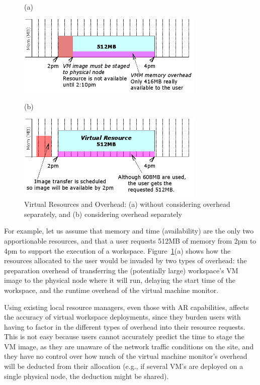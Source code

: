 \documentclass[singlespace]{ccw_chithesis}
\begin{document}
\begin{figure}
  \begin{center}
(a)

    \includegraphics[width=0.8\textwidth]{figures/virtualresources_a.png}

\vspace{3em}
(b)

    \includegraphics[width=0.8\textwidth]{figures/virtualresources_b.png}



    \caption{Virtual Resources and Overhead: (a) without considering overhead separately, and (b) considering overhead separately}
	\label{fig:virtualresources}
  \end{center}
\end{figure}

For example, let us assume that memory and time (availability) are the only two apportionable resources, and that a user requests 512MB of memory from 2pm to 4pm to support the execution of a workspace. Figure~\ref{fig:virtualresources}(a) shows how the resources allocated to the user would be invaded by two types of overhead: the preparation overhead of transferring the (potentially large) workspace's VM image to the physical node where it will run, delaying the start time of the workspace, and the runtime overhead of the virtual machine monitor. 

Using existing local resource managers, even those with AR capabilities, affects the accuracy of virtual workspace deployments, since they burden users with having to factor in the different types of overhead into their resource requests. This is not easy because users cannot accurately predict the time to stage the VM image, as they are unaware of the network traffic conditions on the site, and they have no control over how much of the virtual machine monitor's overhead will be deducted from their allocation (e.g., if several VM's are deployed on a single physical node, the deduction might be shared).
\end{document}
